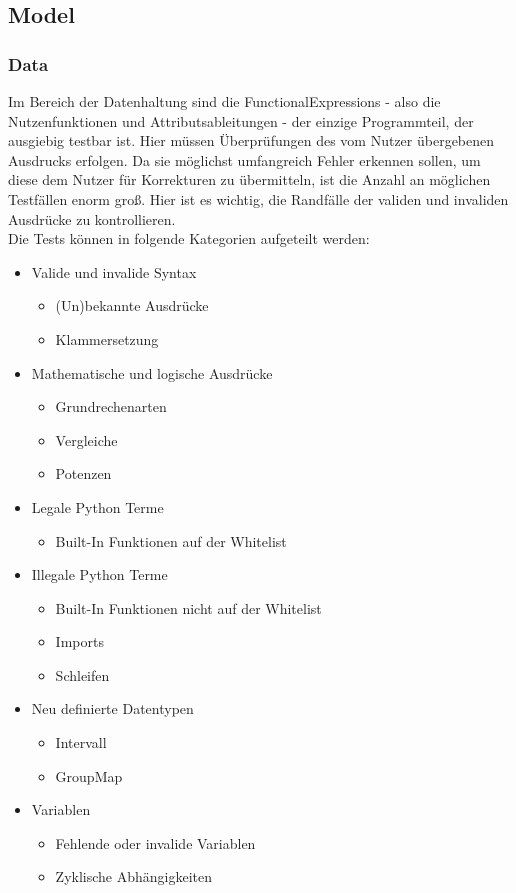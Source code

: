 \documentclass{article}
\begin{document}
\subsection{Model}
\subsubsection{Data}
Im Bereich der Datenhaltung sind die FunctionalExpressions - also die Nutzenfunktionen und Attributsableitungen - der einzige Programmteil, der ausgiebig testbar ist. Hier müssen Überprüfungen des vom Nutzer übergebenen Ausdrucks erfolgen. Da sie möglichst umfangreich Fehler erkennen sollen, um diese dem Nutzer für Korrekturen zu übermitteln, ist die Anzahl an möglichen Testfällen enorm groß. Hier ist es wichtig, die Randfälle der validen und invaliden Ausdrücke zu kontrollieren. \\
Die Tests können in folgende Kategorien aufgeteilt werden:
\begin{itemize}
    \item Valide und invalide Syntax
        \begin{itemize}
            \item (Un)bekannte Ausdrücke
            \item Klammersetzung
        \end{itemize}
    \item Mathematische und logische Ausdrücke
        \begin{itemize}
            \item Grundrechenarten
            \item Vergleiche
            \item Potenzen
        \end{itemize}
    \item Legale Python Terme
        \begin{itemize}
            \item Built-In Funktionen auf der Whitelist
        \end{itemize}
    \item Illegale Python Terme
        \begin{itemize}
            \item Built-In Funktionen nicht auf der Whitelist
            \item Imports
            \item Schleifen
        \end{itemize}
    \item Neu definierte Datentypen
        \begin{itemize}
            \item Intervall
            \item GroupMap
        \end{itemize}
    \item Variablen
        \begin{itemize}
            \item Fehlende oder invalide Variablen
            \item Zyklische Abhängigkeiten
        \end{itemize}
\end{itemize}
\end{document}
